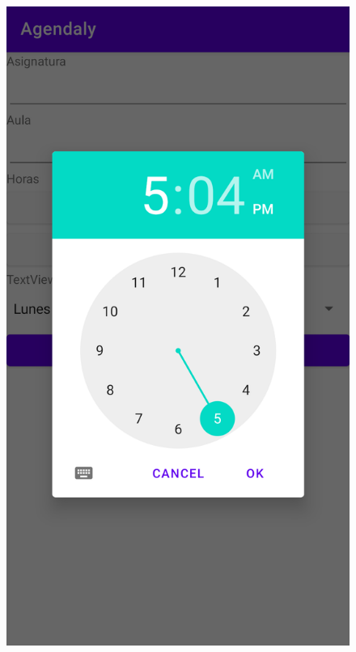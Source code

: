 \documentclass[a4paper,openright,12pt]{article}
\begin{document}
\begin{figure}
            \includegraphics[scale=0.05]{add_timepicker.png}

\end{figure}
\end{document}
